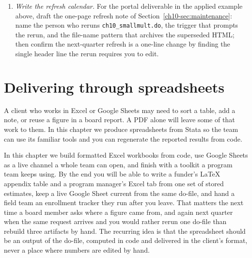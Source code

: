\documentclass[
    a4paper,
    fontsize=10pt,
    twoside=true,
    numbers=noenddot,
]{kaobook}
\begin{document}
\begin{enumerate}
\item \emph{Write the refresh calendar.} For the portal deliverable in the applied example above, draft the one-page refresh note of Section~\ref{ch10-sec:maintenance}: name the person who reruns \texttt{ch10\_smallmult.do}, the trigger that prompts the rerun, and the file-name pattern that archives the superseded HTML; then confirm the next-quarter refresh is a one-line change by finding the single header line the rerun requires you to edit.
\end{enumerate}
\chapter{Delivering through spreadsheets}\label{ch:sheets}

A client who works in Excel or Google Sheets may need to sort a table, add a note, or reuse a figure in a board report. A PDF alone will leave some of that work to them. In this chapter we produce spreadsheets from Stata so the team can use its familiar tools and you can regenerate the reported results from code.

In this chapter we build formatted Excel workbooks from code, use Google Sheets as a live channel a whole team can open, and finish with a toolkit a program team keeps using. By the end you will be able to write a funder's \LaTeX{} appendix table and a program manager's Excel tab from one set of stored estimates, keep a live Google Sheet current from the same do-file, and hand a field team an enrollment tracker they run after you leave. That matters the next time a board member asks where a figure came from, and again next quarter when the same request arrives and you would rather rerun one do-file than rebuild three artifacts by hand. The recurring idea is that the spreadsheet should be an output of the do-file, computed in code and delivered in the client's format, never a place where numbers are edited by hand.
\end{document}
